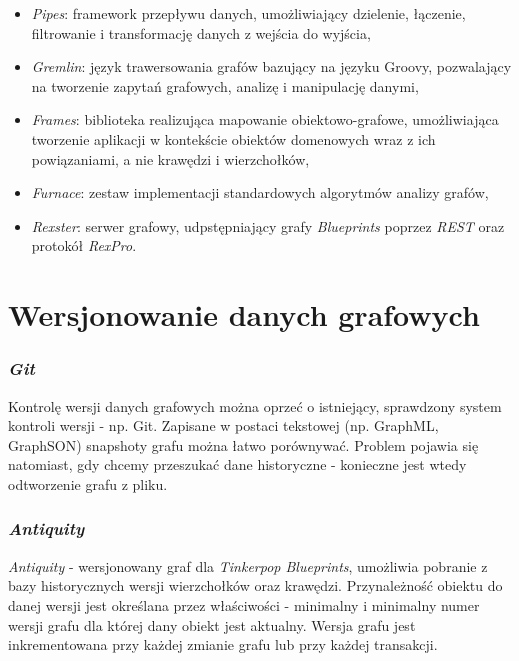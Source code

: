 \begin{itemize}
\item \emph{Pipes}: framework przepływu danych, umożliwiający dzielenie, łączenie, filtrowanie i transformację danych z wejścia do wyjścia,
\item \emph{Gremlin}: język trawersowania grafów bazujący na języku Groovy, pozwalający na tworzenie zapytań grafowych, analizę i manipulację danymi,
\item \emph{Frames}: biblioteka realizująca mapowanie obiektowo-grafowe, umożliwiająca tworzenie aplikacji w kontekście obiektów domenowych wraz z ich powiązaniami, a nie krawędzi i wierzchołków,
\item \emph{Furnace}: zestaw implementacji standardowych algorytmów analizy grafów,
\item \emph{Rexster}: serwer grafowy, udpstępniający grafy \emph{Blueprints} poprzez \emph{REST} oraz protokół \emph{RexPro}.
\end{itemize}




\section{Wersjonowanie danych grafowych}
\label{sec:werjsonowanieDanychGrafowych}

\subsubsection{\emph{Git}}
\label{sec:git}

Kontrolę wersji danych grafowych można oprzeć o istniejący, sprawdzony system kontroli wersji - np. Git. Zapisane w postaci tekstowej (np. GraphML, GraphSON) snapshoty grafu można łatwo porównywać. Problem pojawia się natomiast, gdy chcemy przeszukać dane historyczne - konieczne jest wtedy odtworzenie grafu z pliku.

\subsubsection{\emph{Antiquity}}
\label{sec:antiquity}

\emph{Antiquity} - wersjonowany graf dla \emph{Tinkerpop Blueprints}, umożliwia pobranie z bazy historycznych wersji wierzchołków oraz krawędzi. Przynależność obiektu do danej wersji jest określana przez właściwości - minimalny i minimalny numer wersji grafu dla której dany obiekt jest aktualny. Wersja grafu jest inkrementowana przy każdej zmianie grafu lub przy każdej transakcji.

